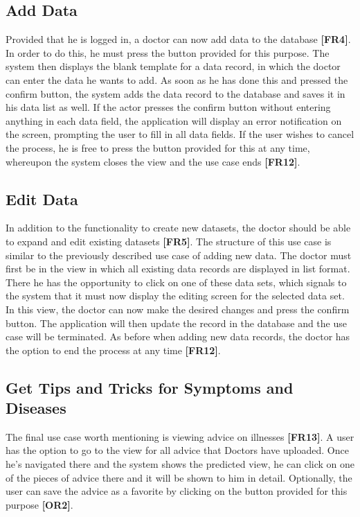 \subsection{Add Data}
Provided that he is logged in, a doctor can now add data to the database \textbf{[FR4]}. In order to do this, he must press the button provided for this purpose. The system then displays the blank template for a data record, in which the doctor can enter the data he wants to add. As soon as he has done this and pressed the confirm button, the system adds the data record to the database and saves it in his data list as well. If the actor presses the confirm button without entering anything in each data field, the application will display an error notification on the screen, prompting the user to fill in all data fields. If the user wishes to cancel the process, he is free to press the button provided for this at any time, whereupon the system closes the view and the use case ends \textbf{[FR12]}. 

\subsection{Edit Data}
In addition to the functionality to create new datasets, the doctor should be able to expand and edit existing datasets \textbf{[FR5]}. The structure of this use case is similar to the previously described use case of adding new data. The doctor must first be in the view in which all existing data records are displayed in list format. There he has the opportunity to click on one of these data sets, which signals to the system that it must now display the editing screen for the selected data set. In this view, the doctor can now make the desired changes and press the confirm button. The application will then update the record in the database and the use case will be terminated. As before when adding new data records, the doctor has the option to end the process at any time \textbf{[FR12]}.

\subsection{Get Tips and Tricks for Symptoms and Diseases}
The final use case worth mentioning is viewing advice on illnesses \textbf{[FR13]}. A user has the option to go to the view for all advice that Doctors have uploaded. Once he's navigated there and the system shows the predicted view, he can click on one of the pieces of advice there and it will be shown to him in detail. Optionally, the user can save the advice as a favorite by clicking on the button provided for this purpose \textbf{[OR2]}. 

